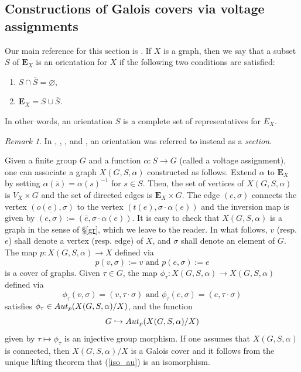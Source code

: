 \documentclass[11pt]{amsart}
\numberwithin{equation}{section}
\theoremstyle{remark}
\newtheorem{remark}[theorem]{Remark}
\begin{document}
\subsection{Constructions of Galois covers via voltage assignments} \label{vo_assign}
Our main reference for this section is \cite{Gross/Tucker:2001}.  If $X$ is a graph, then we say that a subset $S$ of $\mathbf{E}_{X}$ is an orientation for $X$ if the following two conditions are satisfied:
\begin{enumerate}
\item $S \cap \overline{S} = \varnothing$,
\item $\mathbf{E}_{X} = S \cup \overline{S}$.
\end{enumerate}
In other words, an orientation $S$ is a complete set of representatives for $E_{X}$.  
\begin{remark}
In \cite{Vallieres:2021, mcgownvallieresII, mcgownvallieresIII}, \cite{lei2022non}, \cite{Sage/Vallieres:2022}, and \cite{DLRV}, an orientation was referred to instead as a \emph{section}.
\end{remark}
Given a finite group $G$ and a function $\alpha:S \rightarrow G$ (called a voltage assignment), one can associate a graph $X(G,S,\alpha)$ constructed as follows. Extend $\alpha$ to $\mathbf{E}_X$ by setting $\alpha(\bar{s}) = \alpha(s)^{-1}$ for $s \in S$. Then, the set of vertices of $X(G,S,\alpha)$ is $V_{X} \times G$ and the set of directed edges is $\mathbf{E}_{X} \times G$.  The edge $(e,\sigma)$ connects the vertex $(o(e),\sigma)$ to the vertex $(t(e),\sigma\cdot \alpha(e))$ and the inversion map is given by $\overline{(e,\sigma)} := (\bar{e},\sigma \cdot \alpha(e))$. It is easy to check that $X(G,S,\alpha)$ is a graph in the sense of \S \ref{gr}, which we leave to the reader. In what follows, $v$ (resp. $e$) shall denote a vertex (resp. edge) of $X$, and $\sigma$ shall denote an element of $G$.  The map $p:X(G,S,\alpha) \rightarrow X$ defined via
\begin{equation} \label{proj_map}
p(v,\sigma) := v \text{ and } p(e,\sigma) := e 
\end{equation}
is a cover of graphs.  Given $\tau \in G$, the map $\phi_{\tau}:X(G,S,\alpha) \longrightarrow X(G,S,\alpha)$ defined via
$$\phi_{\tau}(v,\sigma) = (v, \tau \cdot \sigma) \text{ and } \phi_{\tau}(e,\sigma) = (e,\tau \cdot \sigma) $$
satisfies $\phi_{\tau} \in {\rm Aut}_{p}(X(G,S,\alpha)/X)$, and the function 
\begin{equation} \label{iso_au}
G \hookrightarrow {\rm Aut}_{p}(X(G,S,\alpha)/X)
\end{equation}
given by $\tau \mapsto \phi_{\tau}$ is an injective group morphism.  If one assumes that $X(G,S,\alpha)$ is connected, then $X(G,S,\alpha)/X$ is a Galois cover and it follows from the unique lifting theorem \cite[Theorem 5.1]{Sunada:2013} that (\ref{iso_au}) is an isomorphism.
\end{document}
